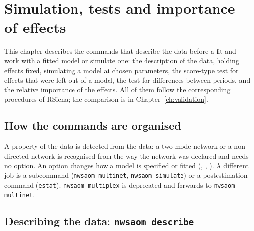 \chapter{Simulation, tests and importance of effects}\label{ch:tools}

This chapter describes the commands that describe the data before a fit and work with a fitted model or simulate one: the description of the data, holding effects fixed, simulating a model at chosen parameters, the score-type test for effects that were left out of a model, the test for differences between periods, and the relative importance of the effects. All of them follow the corresponding procedures of RSiena; the comparison is in Chapter~\ref{ch:validation}.

\section{How the commands are organised}

A property of the data is detected from the data: a two-mode network or a non-directed network is recognised from the way the network was declared and needs no option. An option changes how a model is specified or fitted (, , ). A different job is a subcommand (\texttt{nwsaom multinet}, \texttt{nwsaom simulate}) or a postestimation command (\texttt{estat}). \texttt{nwsaom multiplex} is deprecated and forwards to \texttt{nwsaom multinet}.

\section{Describing the data: \texttt{nwsaom describe}}\label{sec:describe}

